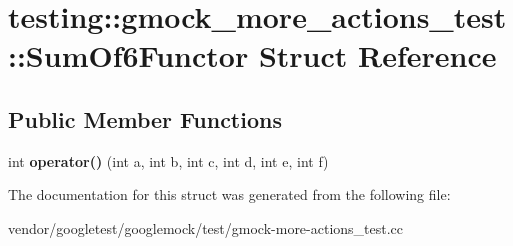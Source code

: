 \hypertarget{structtesting_1_1gmock__more__actions__test_1_1_sum_of6_functor}{}\section{testing\+:\+:gmock\+\_\+more\+\_\+actions\+\_\+test\+:\+:Sum\+Of6\+Functor Struct Reference}
\label{structtesting_1_1gmock__more__actions__test_1_1_sum_of6_functor}
\subsection*{Public Member Functions}
\begin{DoxyCompactItemize}
\item 
\mbox{\label{structtesting_1_1gmock__more__actions__test_1_1_sum_of6_functor_adc0cc4dbd423db7298497b8a9630067e}} 
int {\bfseries operator()} (int a, int b, int c, int d, int e, int f)
\end{DoxyCompactItemize}


The documentation for this struct was generated from the following file\+:\begin{DoxyCompactItemize}
\item 
vendor/googletest/googlemock/test/gmock-\/more-\/actions\+\_\+test.\+cc\end{DoxyCompactItemize}
